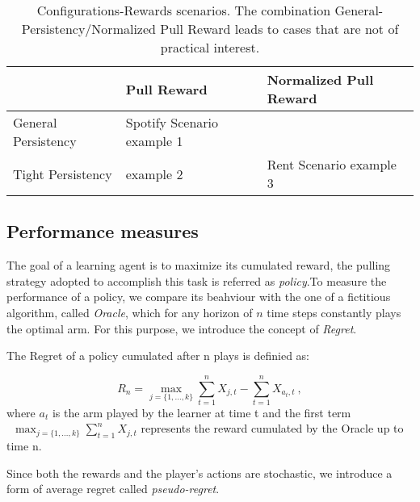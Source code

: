 \begin{table}

\begin{center}
	\caption{Configurations-Rewards scenarios. The combination General-Persistency/Normalized Pull Reward leads to cases that are not of practical interest.}\label{tabNF}
	\begin{tabularx}{0.8\textwidth} { 
			| >{\raggedright\arraybackslash}X 
			| >{\centering\arraybackslash}X 
			| >{\centering\arraybackslash}X | }
		\hline
		  & Pull Reward & Normalized Pull Reward \\
		\hline
		General Persistency  &  Spotify Scenario example 1 &   \\
		\hline
		Tight Persistency  & example 2  & 
			    Rent Scenario example 3
			 \\
		\hline		
	\end{tabularx}	
\end{center}

\end{table}




\subsection{ Performance measures}
The goal of a learning agent is to maximize its cumulated reward, the pulling strategy adopted to accomplish this task is referred as \emph{policy}.To measure the performance of a policy, we compare its beahviour with the one of a fictitious algorithm, called \emph{Oracle}, which for any horizon of $n$ time steps constantly plays the optimal arm. For this purpose, we introduce the concept of \emph{Regret}.
\begin{definition}[Regret]
	The Regret of a policy cumulated after n plays is definied as:
	
		$$R_n=\max_{j = \{1,\dots,k\}} \sum_{t=1}^n{X_{j,t}} - \sum_{t=1}^{n} X_{a_t,t}  \ ,$$
where  $a_t$ is the arm played by the learner at time t and the first term \\\ $\max_{j = \{1,\dots,k\}}\sum_{t=1}^n{X_{j,t}}$ represents the reward cumulated by the Oracle up to time n.

\end{definition}
Since both the rewards and the player's actions are stochastic, we introduce a form of average regret called \emph{pseudo-regret}.

